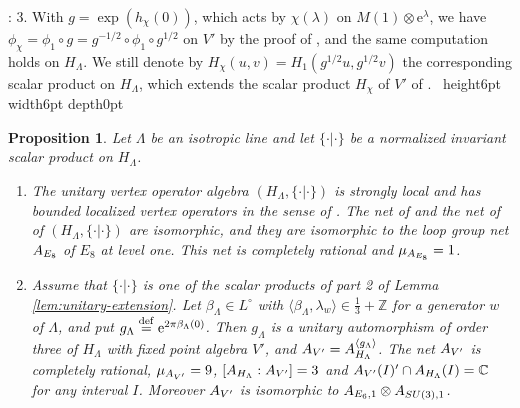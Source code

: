 \documentclass[leqno]{article}
\newcommand{\Cbb}{\ensuremath{\mathbb{C}}}
\let\cal\relax
\newcommand{\cal}{\mathcal}
\newcommand{\Z}{\ensuremath{\mathbb{Z}}}
\newcommand{\qed}{\hfill \vrule height6pt  width6pt depth0pt}
\newcommand{\ot}{\otimes}
\let\i\relax %
\newcommand{\i}{\mathrm{i}}
\newcommand{\ov}{\overset}
\newcommand{\e}{\mathrm{e}} %
\newtheorem{prop}[thm]{Proposition}
\newenvironment{proof}[1][]{\noindent {\it Proof #1} : }{\hbox{~}\qed
\smallskip
}
\numberwithin{equation}{section}
\begin{document}
\begin{proof}
3. With $g = \exp(h_\chi(0))$, which acts by $\chi(\lambda)$ on $M(1) \ot \e^\lambda$, we have $\phi_\chi = \phi_1 \circ g = g^{-1/2} \circ \phi_1 \circ g^{1/2}$ on $V'$ by the proof of \cite[Theorem 10.10]{Arh26}, and the same computation holds on $H_\Lambda$. We still denote by $H_\chi(u,v) = H_1(g^{1/2}u,g^{1/2}v)$ the corresponding scalar product on $H_\Lambda$, which extends the scalar product $H_\chi$ of $V'$ of \cite[Theorem 10.10]{Arh26}.
\end{proof}

\begin{prop}
\label{prop:lattice-nets}
Let $\Lambda$ be an isotropic line and let $\{\cdot|\cdot\}$ be a normalized invariant scalar product on $H_\Lambda$.
\begin{enumerate}
\item The unitary vertex operator algebra $(H_\Lambda,\{\cdot|\cdot\})$ is strongly local and has bounded localized vertex operators in the sense of \cite[Definition 4.12 p.~42]{Ten19a}. The net of \cite{Ten19a} and the net of \cite{CKLW18} of $(H_\Lambda,\{\cdot|\cdot\})$ are isomorphic, and they are isomorphic to the loop group net $\cal A_{E_8}$ of $E_8$ at level one. This net is completely rational and $\mu_{\cal A_{E_8}} = 1$.
\item Assume that $\{\cdot|\cdot\}$ is one of the scalar products of part 2 of Lemma \ref{lem:unitary-extension}. Let $\beta_\Lambda \in L^\circ$ with $\langle \beta_\Lambda,\lambda_w\rangle \in \frac13+\Z$ for a generator $w$ of $\Lambda$, and put $g_\Lambda \ov{\mathrm{def}}{=} \e^{2\pi\i \beta_\Lambda(0)}$. Then $g_\Lambda$ is a unitary automorphism of order three of $H_\Lambda$ with fixed point algebra $V'$, and $\cal A_{V'} = \cal A_{H_\Lambda}^{\langle g_\Lambda\rangle}$. The net $\cal A_{V'}$ is completely rational, $\mu_{\cal A_{V'}} = 9$, $[\cal A_{H_\Lambda} : \cal A_{V'}] = 3$ and $\cal A_{V'}(I)' \cap \cal A_{H_\Lambda}(I) = \Cbb$ for any interval $I$. Moreover $\cal A_{V'}$ is isomorphic to $\cal A_{E_6,1} \ot \cal A_{SU(3),1}$.
\end{enumerate}
\end{prop}
\end{document}
